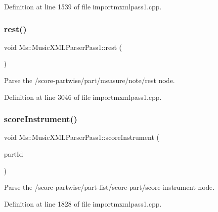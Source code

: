 Definition at line 1539 of file importmxmlpass1.\+cpp.

\mbox{\label{class_ms_1_1_music_x_m_l_parser_pass1_acc3a6e719aed4b0d3f1cd4fc75b418bf}} 
\subsubsection{\texorpdfstring{rest()}{rest()}}
{\footnotesize\ttfamily void Ms\+::\+Music\+X\+M\+L\+Parser\+Pass1\+::rest (\begin{DoxyParamCaption}{ }\end{DoxyParamCaption})}

Parse the /score-\/partwise/part/measure/note/rest node. 

Definition at line 3046 of file importmxmlpass1.\+cpp.

\mbox{\label{class_ms_1_1_music_x_m_l_parser_pass1_a463938c0965929d3e138ef1ee23f6196}} 
\subsubsection{\texorpdfstring{score\+Instrument()}{scoreInstrument()}}
{\footnotesize\ttfamily void Ms\+::\+Music\+X\+M\+L\+Parser\+Pass1\+::score\+Instrument (\begin{DoxyParamCaption}\item[{const Q\+String \&}]{part\+Id }\end{DoxyParamCaption})}

Parse the /score-\/partwise/part-\/list/score-\/part/score-\/instrument node. 

Definition at line 1828 of file importmxmlpass1.\+cpp.

\mbox{\label{class_ms_1_1_music_x_m_l_parser_pass1_ae3c3601c23c0d57e2aa568ca88c06aec}} 
